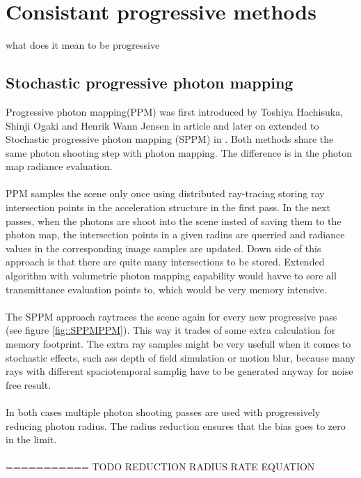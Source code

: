 \chapter{Consistant progressive methods}
what does it mean to be progressive
\section{Stochastic progressive photon mapping}
Progressive photon mapping(PPM) was first introduced by Toshiya Hachisuka, Shinji Ogaki and Henrik Wann Jensen in  \cite{Hachisuka:2008:PPM} article and later on extended to Stochastic progressive photon mapping (SPPM) in \cite{Hachisuka:2009:SPP}. Both methods share the same photon shooting step with photon mapping. The difference is in the photon map radiance evaluation.
\\
\\
PPM samples the scene only once using distributed ray-tracing storing ray intersection
points in the acceleration structure in the first pass. In the next passes, when the photons
are shoot into the scene insted of saving them to the photon map, the intersection points
in a given radius are querried and radiance values in the corresponding image samples are
updated. Down side of this approach is that there are quite many intersections to be stored.
Extended algorithm with volumetric photon mapping capability would havve to sore all
transmittance evaluation points to, which would be very memory intensive.
\\
\\
The SPPM approach raytraces the scene again for every new progressive pass (see figure
\ref{fig::SPPMPPM}). This way it trades of some extra calculation for memory footprint. The extra ray
samples might be very usefull when it comes to stochastic effects, such ass depth of field
simulation or motion blur, because many rays with different spaciotemporal samplig have to
be generated anyway for noise free result.
\\
\\
In both cases multiple photon shooting passes are used with progressively reducing photon
radius. The radius reduction ensures that the bias goes to zero in the limit.
\\
\\
 =========== TODO REDUCTION RADIUS RATE EQUATION

